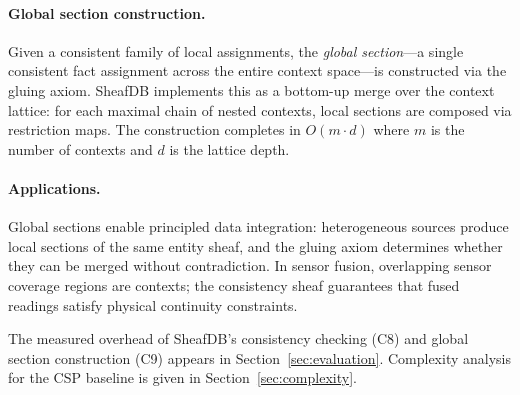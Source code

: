 \paragraph{Global section construction.}
Given a consistent family of local assignments, the \emph{global section}---a single consistent fact assignment across the entire context space---is constructed via the gluing axiom. SheafDB implements this as a bottom-up merge over the context lattice: for each maximal chain of nested contexts, local sections are composed via restriction maps. The construction completes in $O(m \cdot d)$ where $m$ is the number of contexts and $d$ is the lattice depth.

\paragraph{Applications.}
Global sections enable principled data integration: heterogeneous sources produce local sections of the same entity sheaf, and the gluing axiom determines whether they can be merged without contradiction. In sensor fusion, overlapping sensor coverage regions are contexts; the consistency sheaf guarantees that fused readings satisfy physical continuity constraints.

The measured overhead of SheafDB's consistency checking (C8) and global section construction (C9) appears in Section~\ref{sec:evaluation}. Complexity analysis for the CSP baseline is given in Section~\ref{sec:complexity}.
\endinput
